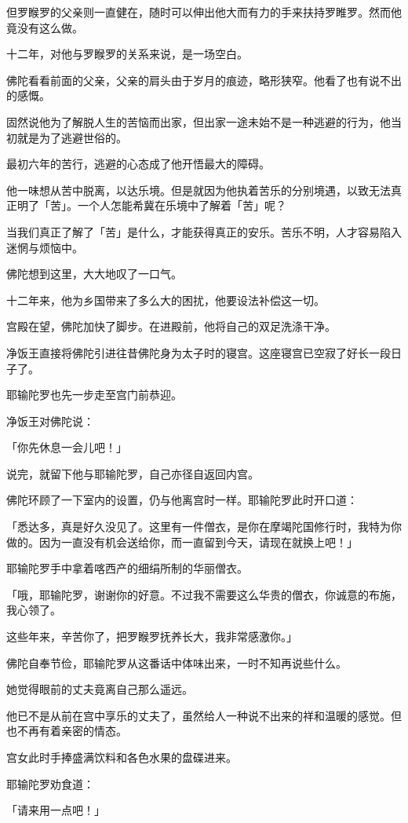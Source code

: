 \documentclass[twoside,openany]{book}
\begin{document}
但罗睺罗的父亲则一直健在，随时可以伸出他大而有力的手来扶持罗睢罗。然而他竟没有这么做。

十二年，对他与罗睺罗的关系来说，是一场空白。

佛陀看看前面的父亲，父亲的肩头由于岁月的痕迹，略形狭窄。他看了也有说不出的感慨。

固然说他为了解脱人生的苦恼而出家，但出家一途未始不是一种逃避的行为，他当初就是为了逃避世俗的。

最初六年的苦行，逃避的心态成了他开悟最大的障碍。

他一味想从苦中脱离，以达乐境。但是就因为他执着苦乐的分别境遇，以致无法真正明了「苦」。一个人怎能希冀在乐境中了解着「苦」呢？

当我们真正了解了「苦」是什么，才能获得真正的安乐。苦乐不明，人才容易陷入迷惘与烦恼中。

佛陀想到这里，大大地叹了一口气。

十二年来，他为乡国带来了多么大的困扰，他要设法补偿这一切。

宫殿在望，佛陀加快了脚步。在进殿前，他将自己的双足洗涤干净。

净饭王直接将佛陀引进往昔佛陀身为太子时的寝宫。这座寝宫已空寂了好长一段日子了。

耶输陀罗也先一步走至宫门前恭迎。

净饭王对佛陀说：

「你先休息一会儿吧！」

说完，就留下他与耶输陀罗，自己亦径自返回内宫。

佛陀环顾了一下室内的设置，仍与他离宫时一样。耶输陀罗此时开口道：

「悉达多，真是好久没见了。这里有一件僧衣，是你在摩竭陀国修行时，我特为你做的。因为一直没有机会送给你，而一直留到今天，请现在就换上吧！」

耶输陀罗手中拿着喀西产的细绢所制的华丽僧衣。

「哦，耶输陀罗，谢谢你的好意。不过我不需要这么华贵的僧衣，你诚意的布施，我心领了。

这些年来，辛苦你了，把罗睺罗抚养长大，我非常感激你。」

佛陀自奉节俭，耶输陀罗从这番话中体味出来，一时不知再说些什么。

她觉得眼前的丈夫竟离自己那么遥远。

他已不是从前在宫中享乐的丈夫了，虽然给人一种说不出来的祥和温暖的感觉。但也不再有着亲密的情态。

宫女此时手捧盛满饮料和各色水果的盘碟进来。

耶输陀罗劝食道：

「请来用一点吧！」
\end{document}
